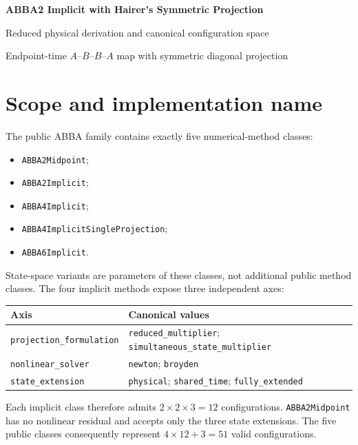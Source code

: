 \documentclass[11pt,a4paper]{article}
\begin{document}
\begin{center}
  {\LARGE\bfseries\color{blue}ABBA2 Implicit with Hairer's Symmetric Projection}\par
  \vspace{0.35em}
  {\large Reduced physical derivation and canonical configuration space}\par
  \vspace{0.45em}
  {\small Endpoint-time $A$--$B$--$B$--$A$ map with symmetric diagonal projection}
\end{center}

\vspace{0.5em}

\section{Scope and implementation name}

The public ABBA family contains exactly five numerical-method classes:
\begin{itemize}
 \item \texttt{ABBA2Midpoint};
 \item \texttt{ABBA2Implicit};
 \item \texttt{ABBA4Implicit};
 \item \texttt{ABBA4ImplicitSingleProjection};
 \item \texttt{ABBA6Implicit}.
\end{itemize}
State-space variants are parameters of these classes, not additional public
method classes.  The four implicit methods expose three independent axes:

\begin{center}
\small
\begin{tabular}{@{}>{\raggedright\arraybackslash}p{}
                    >{\raggedright\arraybackslash}p{}@{}}
\toprule
Axis & Canonical values \\
\midrule
\texttt{projection\_formulation}
  & \texttt{reduced\_multiplier};
    \texttt{simultaneous\_state\_}\allowbreak\texttt{multiplier} \\
\texttt{nonlinear\_solver}
  & \texttt{newton}; \texttt{broyden} \\
\texttt{state\_extension}
  & \texttt{physical}; \texttt{shared\_time}; \texttt{fully\_extended} \\
\bottomrule
\end{tabular}
\end{center}

Each implicit class therefore admits $2\times2\times3=12$ configurations.
\texttt{ABBA2Midpoint} has no nonlinear residual and accepts only the three
state extensions.  The five public classes consequently represent
$4\times12+3=51$ valid configurations.
\end{document}

